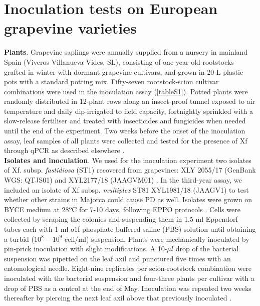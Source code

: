 \section{Inoculation tests on European grapevine
  varieties}\label{app:inoculations}

\textbf{Plants}. Grapevine saplings were annually supplied from a nursery in
mainland Spain (Viveros Villanueva Vides, SL), consisting of one-year-old
rootstocks grafted in winter with dormant grapevine cultivars, and grown in
20-L plastic pots with a standard potting mix. Fifty-seven rootstock-scion
cultivar combinations were used in the inoculation assay (\cref{tableS1}).
Potted plants were randomly distributed in 12-plant rows along an insect-proof
tunnel exposed to air temperature and daily dip-irrigated to field capacity,
fortnightly sprinkled with a slow-release fertiliser and treated with
insecticides and fungicides when needed until the end of the experiment. Two
weeks before the onset of the inoculation assay, leaf samples of all plants
were collected and tested for the presence of Xf through qPCR as described
elsewhere \cite{Moralejo2019}. \\

\noindent\textbf{Isolates and inoculation}. We used for the inoculation
experiment two isolates of Xf. subsp. \textit{fastidiosa} (ST1) recovered from
grapevines: XLY 2055/17 (GenBank WGS: QTJS01) and XYL2177/18 (JAAGVM01)
\cite{Gomila2019,Moralejo2020}. In the third-year assay, we included an isolate
of Xf subsp. \textit{multiplex} ST81 XYL1981/18 (JAAGV1) to test whether
other strains in Majorca could cause PD as well. Isolates were grown on BYCE
medium at 28ºC for 7-10 days, following EPPO protocols \cite{EPPO2018}.  Cells
were collected by scraping the colonies and suspending them in 1.5 ml Eppendorf
tubes each with 1 ml o1f phosphate-buffered saline (PBS) solution until
obtaining a turbid ($10^8-10^9$ cell/ml) suspension. Plants were mechanically
inoculated by pin-prick inoculation \cite{Almeida2003} with slight
modifications. A 10-$\mu l$ drop of the bacterial suspension was pipetted on
the leaf axil and punctured five times with an entomological needle.
Eight-nine replicates per scion-rootstock combination were inoculated with the
bacterial suspension and four-three plants per cultivar with a drop of PBS as a
control at the end of May. Inoculation was repeated two weeks thereafter by
piercing the next leaf axil above that previously inoculated
\cite{Moralejo2019}.\\

